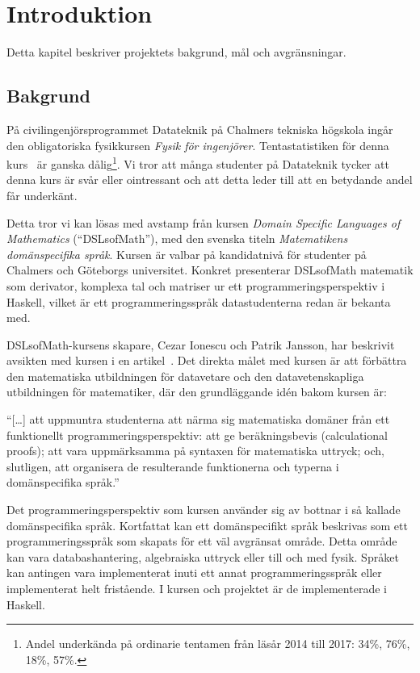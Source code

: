 
\chapter{Introduktion}

Detta kapitel beskriver projektets bakgrund, mål och avgränsningar.

\section{Bakgrund}

På civilingenjörsprogrammet Datateknik på Chalmers tekniska högskola ingår den
obligatoriska fysikkursen \textit{Fysik för ingenjörer}. Tentastatistiken för
denna kurs~\cite{tentastatistik} är ganska dålig\footnote{Andel underkända på ordinarie tentamen från läsår 2014 till
2017: 34\%, 76\%, 18\%, 57\%.}. Vi tror att många studenter på
Datateknik tycker att denna kurs är svår eller ointressant och att detta leder
till att en betydande andel får underkänt.

Detta tror vi kan lösas med avstamp från kursen \textit{Domain
Specific Languages of Mathematics} (``DSLsofMath''), med den svenska titeln
\textit{Matematikens domänspecifika språk}. Kursen är valbar på kandidatnivå för studenter på Chalmers och Göteborgs universitet. Konkret
presenterar DSLsofMath matematik som derivator, komplexa tal och
matriser ur ett programmeringsperspektiv i Haskell, vilket är ett programmeringsspråk datastudenterna redan är bekanta med.

DSLsofMath-kursens skapare, Cezar Ionescu och Patrik Jansson, har beskrivit avsikten med kursen i en artikel~\cite{tfpie2015}. Det direkta målet med kursen är
att förbättra den matematiska utbildningen för datavetare och den
datavetenskapliga utbildningen för matematiker, där den grundläggande idén
bakom kursen är:

\begin{center} ``[\dots] att uppmuntra studenterna att närma sig matematiska
  domäner från ett funktionellt programmeringsperspektiv: att ge beräkningsbevis
  (calculational proofs); att vara uppmärksamma på syntaxen för matematiska
  uttryck; och, slutligen, att organisera de resulterande funktionerna och
typerna i domänspecifika språk.''~\cite{tfpie2015}
\end{center}

Det programmeringsperspektiv som kursen använder sig av bottnar i
så kallade domänspecifika språk. Kortfattat kan ett domänspecifikt språk
beskrivas som ett programmeringsspråk som skapats för ett väl avgränsat
område. Detta område kan vara databashantering, algebraiska uttryck eller till
och med fysik. Språket kan antingen vara implementerat inuti ett annat
programmeringsspråk eller implementerat helt fristående. I kursen och projektet
är de implementerade i Haskell.

